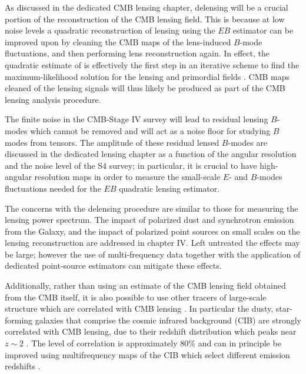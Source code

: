 As discussed in the dedicated CMB lensing chapter, delensing will be a crucial portion of the reconstruction of the CMB lensing field.  This is because at low noise levels a quadratic reconstruction of lensing using the $EB$ estimator \cite{Hu:2001kj} can be improved upon by cleaning the CMB maps of the lens-induced $B$-mode fluctuations, and then performing lens reconstruction again.  In effect, the quadratic estimate of \cite{Hu:2001kj} is effectively the first step in an iterative scheme to find the maximum-likelihood solution for the lensing and primordial fields \cite{HirataSeljak0209489}.  CMB maps cleaned of the lensing signals will thus likely be produced as part of the CMB lensing analysis procedure.

The finite noise in the CMB-Stage IV survey will lead to residual lensing $B$-modes which cannot be removed and will act as a noise floor for studying $B$ modes from tensors.  The amplitude of these residual lensed $B$-modes are discussed in the dedicated lensing chapter as a function of the angular resolution and the noise level of the S4 survey; in particular, it is crucial to have high-angular resolution maps in order to measure the small-scale $E$- and $B$-modes fluctuations needed for the $EB$ quadratic lensing estimator.

The concerns with the delensing procedure are similar to those for measuring the lensing power spectrum. The impact of polarized dust and synchrotron emission from the Galaxy, and the impact of polarized point sources on small scales on the lensing reconstruction are addressed in chapter IV. Left untreated the effects may be large; however the use of  multi-frequency data together with the application of dedicated point-source estimators can mitigate these effects.

Additionally, rather than using an estimate of the CMB lensing field obtained from the CMB itself, it is also possible to use other tracers of large-scale structure which are correlated with  CMB lensing \cite{smith10}.  In particular the dusty, star-forming galaxies that comprise the cosmic infrared background (CIB) are strongly correlated with CMB lensing, due to their redshift distribution which peaks near $z \sim 2$ \cite{sherwin15,simard15}.  The level of correlation is approximately $80\%$ \cite{planck13-18} and can in principle be improved using multifrequency maps of the CIB which select different emission redshifts \cite{sherwin15}.  

